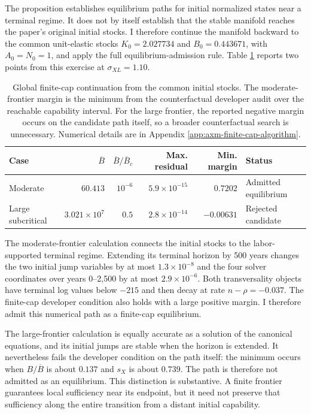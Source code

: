 The proposition establishes equilibrium paths for initial normalized states
near a terminal regime. It does not by itself establish that the stable
manifold reaches the paper's original initial stocks. I therefore continue the
manifold backward to the common unit-elastic stocks
\(K_0=2.027734\) and \(B_0=0.443671\), with \(A_0=N_0=1\), and apply the full
equilibrium-admission rule. Table
\ref{tab:axm-capped-global-continuation} reports two points from this exercise
at \(\sigma_{XL}=1.10\).

\begin{table}[H]
\centering
\scriptsize
\setlength{\tabcolsep}{3pt}
\begin{tabular}{lrrrrl}
\toprule
Case & \(\overline B\) & \(\overline B/\overline B_c\) &
Max. residual & Min. margin & Status\\
\midrule
Moderate & \(60.413\) & \(10^{-6}\) &
\(5.9\times10^{-15}\) & \(0.7202\) & Admitted equilibrium\\
Large subcritical & \(3.021\times10^7\) & \(0.5\) &
\(2.8\times10^{-14}\) & \(-0.00631\) & Rejected candidate\\
\bottomrule
\end{tabular}
\caption{Global finite-cap continuation from the common initial stocks. The
moderate-frontier margin is the minimum from the counterfactual developer
audit over the reachable capability interval. For the large frontier, the
reported negative margin occurs on the candidate path itself, so a broader
counterfactual search is unnecessary. Numerical details are in Appendix
\ref{app:axm-finite-cap-algorithm}.}
\label{tab:axm-capped-global-continuation}
\end{table}

The moderate-frontier calculation connects the initial stocks to the
labor-supported terminal regime. Extending its terminal horizon by 500 years
changes the two initial jump variables by at most \(1.3\times10^{-8}\) and the
four solver coordinates over years 0--2,500 by at most
\(2.9\times10^{-6}\). Both transversality objects have terminal log values
below \(-215\) and then decay at rate \(n-\rho=-0.037\). The finite-cap
developer condition also holds with a large positive margin. I therefore admit
this numerical path as a finite-cap equilibrium.

The large-frontier calculation is equally accurate as a solution of the
canonical equations, and its initial jumps are stable when the horizon is
extended. It nevertheless fails the developer condition on the path itself:
the minimum occurs when \(B/\overline B\) is about \(0.137\) and \(s_X\) is
about \(0.739\). The path is therefore not admitted as an equilibrium. This
distinction is substantive. A finite frontier guarantees local sufficiency
near its endpoint, but it need not preserve that sufficiency along the entire
transition from a distant initial capability.

